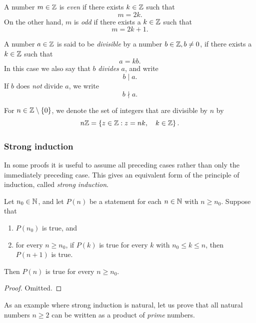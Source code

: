 \documentclass[11pt,a4paper]{amsart}
\begin{document}
\begin{definition}
  A number \(m \in \mathbb{Z}\) is \emph{even} if there exists \(k \in \mathbb{Z}\) such that
  \[
    m = 2k.
  \]
  On the other hand, \(m\) is \emph{odd} if there exists a \(k \in \mathbb{Z}\) such
  that
  \[
    m = 2k + 1.
  \]
\end{definition}

\begin{definition}[Divisibility]
  A number \(a \in \mathbb{Z}\) is said to be \emph{divisible} by a number
  \(b \in \mathbb{Z}, b \neq 0\), if there exists a \(k \in \mathbb{Z}\) such that
  \[
    a = kb.
  \]
  In this case we also say that \(b\) \emph{divides} \(a\), and write
  \[
    b \mid a.
  \]
  If \(b\) does \emph{not} divide \(a\), we write
  \[
    b \nmid a.
  \]
\end{definition}

\begin{definition}
  For \(n \in \mathbb{Z} \setminus \{0\}\), we denote the set of integers that are
  divisible by \(n\) by
  \[
    n\mathbb{Z} = \left\{z \in \mathbb{Z} : z = nk, \quad k \in \mathbb{Z}\right\}.
  \]
\end{definition}

\subsubsection{Strong induction}

In some proofs it is useful to assume all preceding cases rather than only the
immediately preceding case. This gives an equivalent form of the principle of
induction, called \emph{strong induction}.

\begin{theorem}\label{thm:strong-induction}
  Let \(n_0 \in \mathbb{N}\), and let \(P(n)\) be a statement for each
  \(n \in \mathbb{N}\) with \(n \geq n_0\). Suppose that
  \begin{enumerate}
    \item \(P(n_0)\) is true, and
    \item for every \(n \geq n_0\), if \(P(k)\) is true for every \(k\) with
      \(n_0 \leq k \leq n\), then \(P(n + 1)\) is true.
  \end{enumerate}
  Then \(P(n)\) is true for every \(n \geq n_0\).
\end{theorem}

\begin{proof}
  Omitted.
\end{proof}

As an example where strong induction is natural, let us prove that all natural
numbers \(n \geq 2\) can be written as a product of \emph{prime} numbers.
\end{document}
